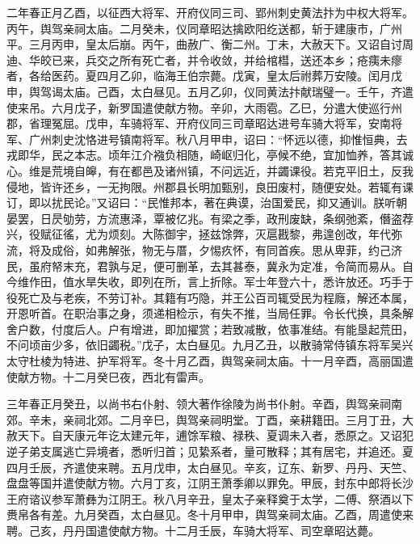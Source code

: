 \documentclass[]{article}
\begin{document}
二年春正月乙酉，以征西大将军、开府仪同三司、郢州刺史黄法抃为中权大将军。丙午，舆驾亲祠太庙。二月癸未，仪同章昭达擒欧阳纥送都，斩于建康市，广州平。三月丙申，皇太后崩。丙午，曲赦广、衡二州。丁未，大赦天下。又诏自讨周迪、华皎已来，兵交之所有死亡者，并令收敛，并给棺槥，送还本乡；疮痍未瘳者，各给医药。夏四月乙卯，临海王伯宗薨。戊寅，皇太后祔葬万安陵。闰月戊申，舆驾谒太庙。己酉，太白昼见。五月乙卯，仪同黄法抃献瑞璧一。壬午，齐遣使来吊。六月戊子，新罗国遣使献方物。辛卯，大雨雹。乙巳，分遣大使巡行州郡，省理冤屈。戊申，车骑将军、开府仪同三司章昭达进号车骑大将军，安南将军、广州刺史沈恪进号镇南将军。秋八月甲申，诏曰：``怀远以德，抑惟恒典，去戎即华，民之本志。顷年江介襁负相随，崎岖归化，亭候不绝，宜加恤养，答其诚心。维是荒境自皞，有在都邑及诸州镇，不问远近，并蠲课役。若克平旧土，反我侵地，皆许还乡，一无拘限。州郡县长明加甄别，良田废村，随便安处。若辄有课订，即以扰民论。''又诏曰：``民惟邦本，著在典谟，治国爱民，抑又通训。朕听朝晏罢，日昃劬劳，方流惠泽，覃被亿兆。有梁之季，政刑废缺，条纲弛紊，僭盗荐兴，役赋征徭，尤为烦刻。大陈御宇，拯兹馀弊，灭扈戡黎，弗遑创改，年代弥流，将及成俗，如弗解张，物无与厝，夕惕疚怀，有同首疾。思从卑菲，约己济民，虽府帑末充，君孰与足，便可删革，去其甚泰，冀永为定准，令简而易从。自今维作田，值水旱失收，即列在所，言上折除。军士年登六十，悉许放还。巧手于役死亡及与老疾，不劳订补。其籍有巧隐，并王公百司辄受民为程廕，解还本属，开恩听首。在职治事之身，须递相检示，有失不推，当局任罪。令长代换，具条解舍户数，付度后人。户有增进，即加擢赏；若致减散，依事准结。有能垦起荒田，不问顷亩少多，依旧蠲税。''戊子，太白昼见。九月乙丑，以散骑常侍镇东将军吴兴太守杜棱为特进、护军将军。冬十月乙酉，舆驾亲祠太庙。十一月辛酉，高丽国遣使献方物。十二月癸巳夜，西北有雷声。

三年春正月癸丑，以尚书右仆射、领大著作徐陵为尚书仆射。辛酉，舆驾亲祠南郊。辛未，亲祠北郊。二月辛巳，舆驾亲祠明堂。丁酉，亲耕籍田。三月丁丑，大赦天下。自天康元年讫太建元年，逋馀军粮、禄秩、夏调未入者，悉原之。又诏犯逆子弟支属逃亡异境者，悉听归首；见絷系者，量可散释；其有居宅，并追还。夏四月壬辰，齐遣使来聘。五月戊申，太白昼见。辛亥，辽东、新罗、丹丹、天竺、盘盘等国并遣使献方物。六月丁亥，江阴王萧季卿以罪免。甲辰，封东中郎将长沙王府谘议参军萧彝为江阴王。秋八月辛丑，皇太子亲释奠于太学，二傅、祭酒以下赉帛各有差。九月癸酉，太白昼见。冬十月甲申，舆驾亲祠太庙。乙酉，周遣使来聘。己亥，丹丹国遣使献方物。十二月壬辰，车骑大将军、司空章昭达薨。
\end{document}
